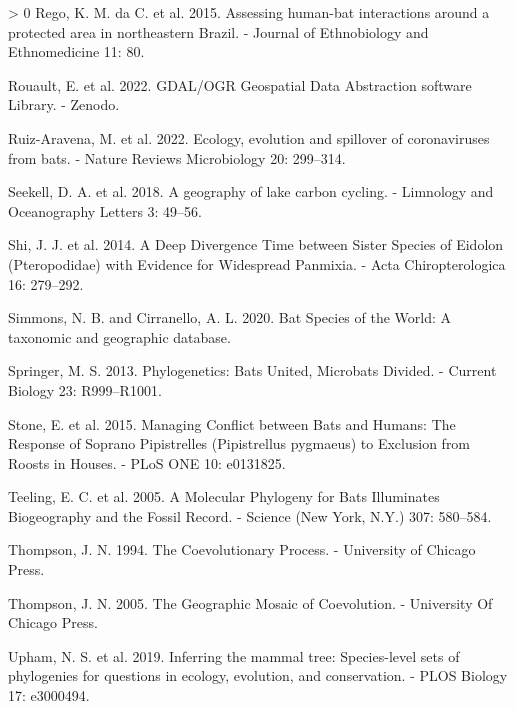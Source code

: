 \documentclass[11pt]{article}
\newlength{\cslhangindent}
\newenvironment{CSLReferences}[3] %
 {%
  \setlength{\parindent}{0pt}
  \ifodd #1 \everypar{\setlength{\hangindent}{\cslhangindent}}\ignorespaces\fi
  \ifnum #2 > 0
  \setlength{\parskip}{#2\baselineskip}
  \fi
 }%
 {}
\begin{document}
\begin{CSLReferences}{1}{0}
\leavevmode\hypertarget{ref-Rego2015AssHum}{}%
Rego, K. M. da C. et al. 2015. Assessing human-bat interactions around a
protected area in northeastern Brazil. - Journal of Ethnobiology and
Ethnomedicine 11: 80.

\leavevmode\hypertarget{ref-RouaultEven2022GdaOgr}{}%
Rouault, E. et al. 2022. GDAL/OGR Geospatial Data Abstraction software
Library. - Zenodo.

\leavevmode\hypertarget{ref-Ruiz-Aravena2022EcoEvo}{}%
Ruiz-Aravena, M. et al. 2022. Ecology, evolution and spillover of
coronaviruses from bats. - Nature Reviews Microbiology 20: 299--314.

\leavevmode\hypertarget{ref-Seekell2018GeoLak}{}%
Seekell, D. A. et al. 2018. A geography of lake carbon cycling. -
Limnology and Oceanography Letters 3: 49--56.

\leavevmode\hypertarget{ref-Shi2014DeeDiv}{}%
Shi, J. J. et al. 2014. A Deep Divergence Time between Sister Species of
Eidolon (Pteropodidae) with Evidence for Widespread Panmixia. - Acta
Chiropterologica 16: 279--292.

\leavevmode\hypertarget{ref-Simmons2020BatSpe}{}%
Simmons, N. B. and Cirranello, A. L. 2020. Bat Species of the World: A
taxonomic and geographic database.

\leavevmode\hypertarget{ref-Springer2013PhyBat}{}%
Springer, M. S. 2013. Phylogenetics: Bats United, Microbats Divided. -
Current Biology 23: R999--R1001.

\leavevmode\hypertarget{ref-Stone2015ManCon}{}%
Stone, E. et al. 2015. Managing Conflict between Bats and Humans: The
Response of Soprano Pipistrelles (Pipistrellus pygmaeus) to Exclusion
from Roosts in Houses. - PLoS ONE 10: e0131825.

\leavevmode\hypertarget{ref-Teeling2005MolPhy}{}%
Teeling, E. C. et al. 2005. A Molecular Phylogeny for Bats Illuminates
Biogeography and the Fossil Record. - Science (New York, N.Y.) 307:
580--584.

\leavevmode\hypertarget{ref-Thompson1994CoePro}{}%
Thompson, J. N. 1994. The Coevolutionary Process. - University of
Chicago Press.

\leavevmode\hypertarget{ref-Thompson2005GeoMos}{}%
Thompson, J. N. 2005. The Geographic Mosaic of Coevolution. - University
Of Chicago Press.

\leavevmode\hypertarget{ref-Upham2019InfMam}{}%
Upham, N. S. et al. 2019. Inferring the mammal tree: Species-level sets
of phylogenies for questions in ecology, evolution, and conservation. -
PLOS Biology 17: e3000494.


\end{CSLReferences}
\end{document}
